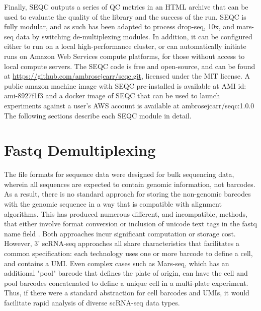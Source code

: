 Finally, SEQC outputs a series of QC metrics in an HTML archive that can be used to evaluate the quality of the library and the success of the run. 
SEQC is fully modular, and as such has been adapted to process drop-seq, 10x, and mars-seq data by switching de-multiplexing modules.  
In addition, it can be configured either to run on a local high-performance cluster, or can automatically initiate runs on Amazon Web Services compute platforms, for those without access to local compute servers. 
The SEQC code is free and open-source, and can be found at \href{https://github.com/ambrosejcarr/seqc.git}{https://github.com/ambrosejcarr/seqc.git}, licensed under the MIT license. 
A public amazon machine image with SEQC pre-installed is available at AMI id: {\mono ami-8927f1f3} and a docker image of SEQC that can be used to launch experiments against a user's AWS account is available at {\mono ambrosejcarr/seqc:1.0.0}
The following sections describe each SEQC module in detail. 

\section{Fastq Demultiplexing}

The file formats for sequence data were designed for bulk sequencing data, wherein all sequences are expected to contain genomic information, not barcodes.
As a result, there is no standard approach for storing the non-genomic barcodes with the genomic sequence in a way that is compatible with alignment algorithms.
This has produced numerous different, and incompatible, methods, that either involve format conversion \citep{Macosko2015} or inclusion of unicode text tags in the fastq name field \citep{Jaitin2014}. 
Both approaches incur significant computation or storage cost.
However, 3' scRNA-seq approaches all share characteristics that facilitates a common specification: each technology uses one or more barcode to define a cell, and contains a UMI\@. 
Even complex cases such as Mars-seq, which has an additional "pool" barcode that defines the plate of origin, can have the cell and pool barcodes concatenated to define a unique cell in a multi-plate experiment.
Thus, if there were a standard abstraction for cell barcodes and UMIs, it would facilitate rapid analysis of diverse scRNA-seq data types.

